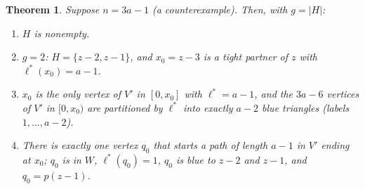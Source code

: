 \documentclass[11pt]{article}
\theoremstyle{plain}
\newtheorem{theorem}{Theorem}
\theoremstyle{remark}
\begin{document}
\begin{theorem}\label{thm:shape}
Suppose $n = 3a-1$ (a counterexample). Then, with $g = |H|$:
\begin{enumerate}
  \item $H$ is nonempty.
  \item $g = 2$: $H = \{z-2, z-1\}$, and $x_0 = z-3$ is a tight partner of $z$ with $\ell^*(x_0) = a-1$.
  \item $x_0$ is the only vertex of $V'$ in $[0, x_0]$ with $\ell^* = a-1$, and the $3a-6$ vertices of $V'$ in
  $[0, x_0)$ are partitioned by $\ell^*$ into exactly $a-2$ blue triangles (labels $1, \dots, a-2$).
  \item There is exactly one vertex $q_0$ that starts a path of length $a-1$ in $V'$ ending at $x_0$; $q_0$ is in
  $W$, $\ell^*(q_0) = 1$, $q_0$ is blue to $z-2$ and $z-1$, and $q_0 = p(z-1)$.
\end{enumerate}
\end{theorem}
\end{document}
